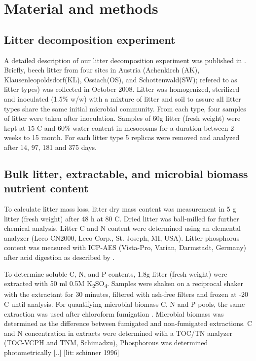 \section{Material and methods}

\subsection{Litter decomposition experiment}
A detailed description of our litter decomposition experiment was published in \cite{Wanek2011}. Briefly, beech litter from four sites in Austria (Achenkirch (AK), Klausenleopoldsdorf(KL), Ossiach(OS), and Schottenwald(SW); refered to as litter types) was collected in October 2008. Litter was homogenized, sterilized and inoculated (1.5\% w/w) with a mixture of litter and soil to assure all litter types share the same initial microbial community. From each type, four samples of  litter were taken after inoculation.
Samples of 60g litter (fresh weight) were kept at 15 \textdegree C and 60\% water content in mesocosms for a duration between 2 weeks to 15 month. For each litter type 5 replicas were removed and analyzed after 14, 97, 181 and 375 days. 

\subsection{Bulk litter, extractable, and microbial biomass nutrient content}
To calculate litter mass loss, litter dry mass content was measurement in 5 g litter (fresh weight) after 48 h at 80 \textdegree C. Dried litter was ball-milled for further chemical analysis. Litter C and N content were determined using an elemental analyzer (Leco CN2000, Leco Corp., St. Joseph, MI, USA). Litter phosphorus content was measured  with ICP-AES (Vista-Pro, Varian, Darmstadt, Germany) after acid digestion as described by \cite{Henschler1988}.

To determine soluble C, N, and P contents, 1.8g litter (fresh weight) were extracted with 50 ml 0.5M K\textsubscript{2}SO\textsubscript{4}. Samples were shaken on a reciprocal shaker with the extractant for 30 minutes, filtered with ash-free filters and frozen at -20 \textdegree C until analysis. For quantifying microbial biomass C, N and P pools, the same extraction was used after chloroform fumigation . Microbial biomass was determined as the difference between fumigated and non-fumigated extractions. C and N concentration in extracts were determined with a TOC/TN analyzer (TOC-VCPH and TNM, Schimadzu), Phosphorous was determined photometrically [..] [lit: schinner 1996]

